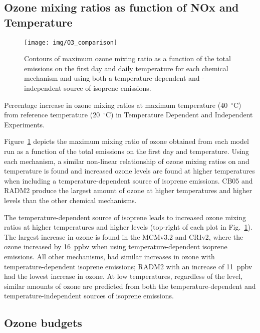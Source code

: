 \subsection{Ozone mixing ratios as function of NOx and Temperature} \label{ss:r_contours}

\begin{figure}%
    \centering%
    \caption{Contours of maximum ozone mixing ratio as a function of the total  emissions on the first day and daily temperature for each chemical mechanism and using both a temperature-dependent and -independent source of isoprene emissions.}
    \label{f:ozone_contours}%
    \texttt{[image: img/O3\_comparison]}
\end{figure}

\begin{table}%
    \centering%
    \caption{Percentage increase in ozone mixing ratios at maximum temperature ($40$~$^{\circ}$C) from reference temperature ($20$~$^{\circ}$C) in Temperature Dependent and Independent Experiments.}%
    \label{t:difference_td_ti}%
    
\end{table}

Figure~\ref{f:ozone_contours} depicts the maximum mixing ratio of ozone obtained from each model run as a function of the total  emissions on the first day and temperature.
Using each mechanism, a similar non-linear relationship of ozone mixing ratios on  and temperature is found and increased ozone levels are found at higher temperatures when including a temperature-dependent source of isoprene emissions.
CB05 and RADM2 produce the largest amount of ozone at higher temperatures and higher  levels than the other chemical mechanisms.

The temperature-dependent source of isoprene leads to increased ozone mixing ratios at higher temperatures and higher  levels (top-right of each plot in Fig.~\ref{f:ozone_contours}).
The largest increase in ozone is found in the MCMv3.2 and CRIv2, where the ozone increased by 16~ppbv when using temperature-dependent isoprene emissions.
All other mechanisms, had similar increases in ozone with temperature-dependent isoprene emissions; RADM2 with an increase of 11~ppbv had the lowest increase in ozone.
At low temperatures, regardless of the  level, similar amounts of ozone are predicted from both the temperature-dependent and temperature-independent sources of isoprene emissions.

\subsection{Ozone budgets} \label{ss:r_budgets}

